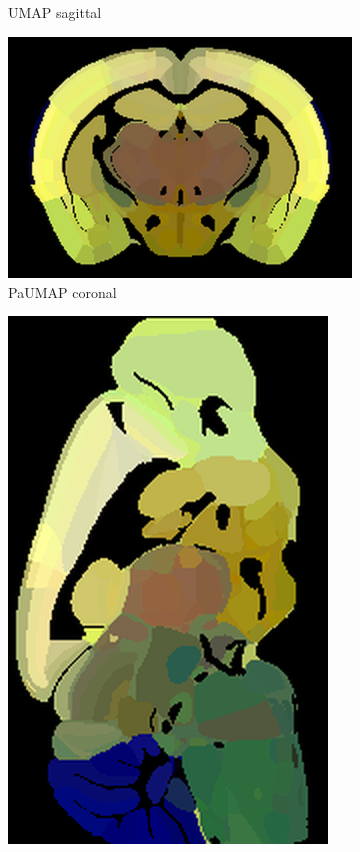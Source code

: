 \documentclass[]{article}
\begin{document}
\begin{figure}
\begin{subfigure}{.176\textwidth}
		\caption{UMAP sagittal}
		\label{fig:UMAP_sag}
	\end{subfigure}\hspace{1.3cm}
	\begin{subfigure}{.25\textwidth}
		\centering
		\includegraphics[width=.9\linewidth]{../results/para_umap_ano_coronal_50_res_slice_1.png}
		\caption{PaUMAP coronal}
		\label{fig:ParaUMAP_cor}
	\end{subfigure}
	\begin{subfigure}{.176\textwidth}
		\centering
		\includegraphics[width=.9\linewidth, angle=270]{../results/para_umap_ano_sagittal_50_res_slice_1.png}

\end{subfigure}
\end{figure}
\end{document}
